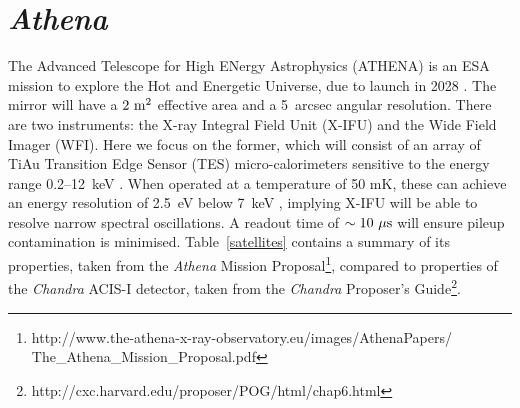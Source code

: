 \documentclass[fleqn,usenatbib,useAMS]{mnras}
\begin{document}
\begin{figure*}
\end{figure*}

\section{{\it Athena}}
\label{athena}
The Advanced Telescope for High ENergy Astrophysics (ATHENA) is an ESA mission to explore the Hot and Energetic Universe, due to launch in 2028 \citep{Nandra:2013shg}. The mirror will have a $2~\rm{m}^2$ effective area and a 5~arcsec angular resolution. There are two instruments: the X-ray Integral Field Unit (X-IFU) and the Wide Field Imager (WFI). Here we focus on the former, which will consist of an array of TiAu Transition Edge Sensor (TES) micro-calorimeters sensitive to the energy range 0.2--12~keV \citep{Barret:2016ett}. When operated at a temperature of 50 mK, these can achieve an energy resolution of 2.5~eV below 7~keV \citep{Gottardi:2016cdx}, implying X-IFU will be able to resolve narrow spectral oscillations. A readout time of $\sim10~\mu\rm{s}$ will ensure pileup contamination is minimised. Table~\ref{satellites} contains
a summary of its properties, taken from the {\it Athena} Mission Proposal\footnote{http://www.the-athena-x-ray-observatory.eu/images/AthenaPapers/ \\ The\_Athena\_Mission\_Proposal.pdf}, compared to properties of the {\it Chandra} ACIS-I detector, taken from the {\it Chandra} Proposer's Guide\footnote{http://cxc.harvard.edu/proposer/POG/html/chap6.html}.
\end{document}
